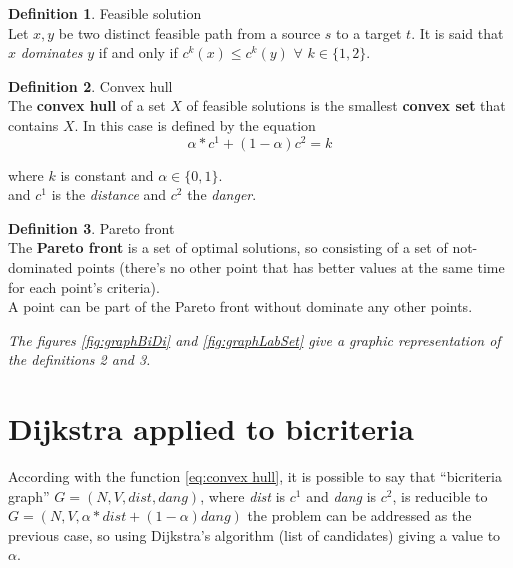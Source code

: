 \documentclass[a4paper,11pt]{report}
\begin{document}
\theoremstyle{definition}
\newtheorem{definition}{Definition}
\begin{definition}{Feasible solution}\\
	Let $x, y$ be two distinct feasible path from a source $s$ to a target $t$. It is said that $x$ \emph{dominates} $y$ if and only if $c^k(x) \leq c^k(y)$ $\forall$ $k \in \{1,2\}$.
\end{definition}

\theoremstyle{definition}
\begin{definition}{Convex hull}\\
	The \textbf{convex hull} of a set $X$ of feasible solutions is the smallest \textbf{convex set} that contains $X$. In this case is defined by the equation 
	\begin{equation}\label{eq:convex hull}
	\alpha*c^1 + (1-\alpha) c^2 = k
	\end{equation}
	\begin{center}
		where $k$ is constant and $\alpha \in \{0, 1\}$.\\
		and $c^1$ is the \textit{distance} and $c^2$ the \textit{danger}.
	\end{center}
\end{definition}

\begin{definition}{Pareto front}\\
	The \textbf{Pareto front} is a set of optimal solutions, so consisting of a set of not-dominated points (there's no other point that has better values at the same time for each point's criteria).
	\\A point can be part of the Pareto front without dominate any other points.
\end{definition}
{\small \textit{The figures \ref{fig:graphBiDi} and \ref{fig:graphLabSet} give a graphic representation of the definitions 2 and 3.}}

\section{Dijkstra applied to bicriteria}
According with the function \ref{eq:convex hull}, it is possible to say that ``bicriteria graph'' $G=(N,V,dist,dang)$, where \textit{dist} is $c^1$ and \textit{dang} is $c^2$, is reducible to $G=(N,V,\alpha*dist + (1-\alpha) dang)$  the problem can be addressed as the previous case, so using Dijkstra's algorithm (list of candidates) giving a value to $\alpha$. \\
\end{document}
